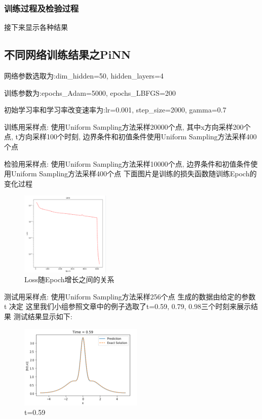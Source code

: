 \documentclass[addpoints,answers]{exam}
\begin{document}
    \subsubsection{训练过程及检验过程}
    接下来显示各种结果

   \subsection{不同网络训练结果之PiNN}
	网络参数选取为:dim\_hidden=50, hidden\_layers=4
	
	训练参数为:epochs\_Adam=5000, epochs\_LBFGS=200
	
	初始学习率和学习率改变速率为:lr=0.001, step\_size=2000, gamma=0.7
	
	训练用采样点: 使用Uniform Sampling方法采样20000个点, 其中x方向采样200个点, t方向采样100个时刻, 边界条件和初值条件使用Uniform Sampling方法采样400个点
	
	检验用采样点: 使用Uniform Sampling方法采样10000个点, 边界条件和初值条件使用Uniform Sampling方法采样400个点
	下面图片是训练的损失函数随训练Epoch的变化过程
	\clearpage
     \vspace{0.5cm}
    \begin{figure}
    	\centering
    	\includegraphics[height=4cm]{4.png}
    	\caption{Loss随Epoch增长之间的关系}
    \end{figure}
	测试用采样点: 使用Uniform Sampling方法采样256个点
	生成的数据由给定的参数 t 决定
	这里我们小组参照文章中的例子选取了t=0.59, 0.79, 0.98三个时刻来展示结果
	测试结果显示如下:
	\clearpage
    \vspace{0.5cm}
        \vspace{0.5cm}
    \begin{figure}
    	\centering
    	\includegraphics[height=4cm]{1.png}
    	\caption{t=0.59}
    \end{figure}
    
\end{document}
